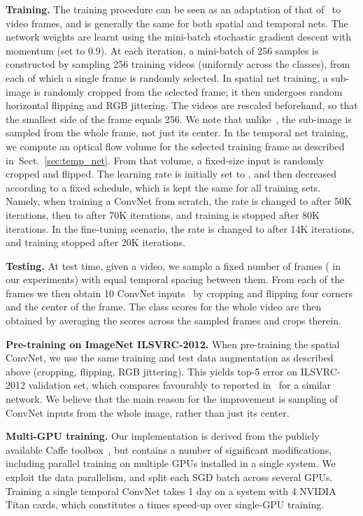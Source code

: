 \documentclass{article} \usepackage{nips14submit_e,times}
\newcommand{\sref}[1]{Sect.~\ref{#1}}
\begin{document}
\noindent\textbf{Training.} The training procedure can be seen as an adaptation of that of~\cite{Krizhevsky12} to video frames, and is generally the same for both spatial and temporal nets.
The network weights are learnt using the mini-batch stochastic gradient descent with momentum (set to 0.9).
At each iteration, a mini-batch of 256 samples is constructed by sampling 256 training videos (uniformly across the classes), from each of which a single frame is randomly selected.
In spatial net training,  a  sub-image is randomly cropped from the selected frame; it then undergoes random horizontal flipping and RGB jittering.
The videos are rescaled beforehand, so that the smallest side of the frame equals 256. 
We note that unlike~\cite{Krizhevsky12}, the sub-image is sampled from the whole frame, not just its  center.
In the temporal net training, we compute an optical flow volume  for the selected training frame as described in~\sref{sec:temp_net}.
From that volume, a fixed-size  input is randomly cropped and flipped.
The learning rate is initially set to , and then decreased according to a fixed schedule, which is kept the same for all training sets. 
Namely, when training a ConvNet from scratch, the rate is changed to  after 50K iterations, then to  after 70K iterations, and training is stopped after 80K iterations.
In the fine-tuning scenario, the rate is changed to  after 14K iterations, and training stopped after 20K iterations.

\noindent\textbf{Testing.} At test time, given a video, we sample a fixed number of frames ( in our experiments) with equal temporal spacing between them. 
From each of the frames we then obtain 10 ConvNet inputs~\cite{Krizhevsky12} by cropping and flipping four corners and the center of the frame.
The class scores for the whole video are then obtained by averaging the scores across the sampled frames and crops therein.

\noindent\textbf{Pre-training on ImageNet ILSVRC-2012.}
When pre-training the spatial ConvNet, we use the same training and test data augmentation as described above (cropping, flipping, RGB jittering). 
This yields  top-5 error on ILSVRC-2012 validation set, which compares favourably to  reported in~\cite{Zeiler13} for a similar network. 
We believe that the main reason for the improvement is sampling of ConvNet inputs from the whole image, rather than just its center.

\noindent\textbf{Multi-GPU training.}
Our implementation is derived from the publicly available Caffe toolbox~\cite{Jia13}, but contains a number of significant modifications, including parallel 
training on multiple GPUs installed in a single system. We exploit the data parallelism, and split each SGD batch across several GPUs.
Training a single temporal ConvNet takes 1 day on a system with 4 NVIDIA Titan cards, which constitutes a  times speed-up over single-GPU training.
\end{document}
